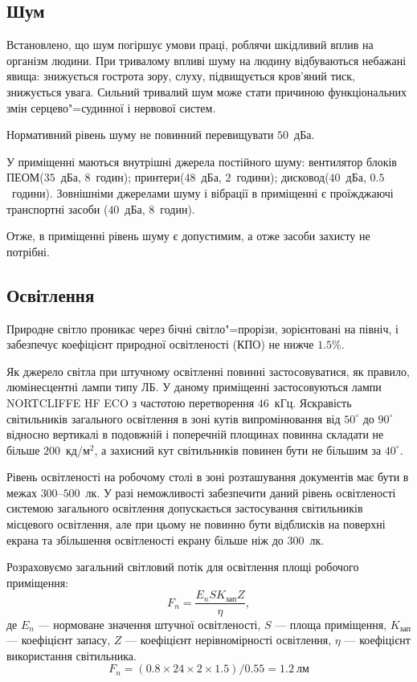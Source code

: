 \documentclass{diploma}
\begin{document}
    \subsection{Шум}
      Встановлено, що шум погіршує умови праці, роблячи шкідливий вплив на
      організм людини.
      При тривалому впливі шуму на людину відбуваються небажані явища:
      знижується гострота зору, слуху, підвищується кров’яний тиск, знижується
      увага.
      Сильний тривалий шум може стати причиною функціональних змін
      серцево"=судинної і нервової систем.

      Нормативний рівень шуму не повинний перевищувати $50$~дБа\cite{dsn037}.

      У приміщенні маються внутрішні джерела постійного шуму: вентилятор
      блоків ПЕОМ($35$~дБа, $8$~годин); принтери($48$~дБа, $2$~години);
      дисковод($40$~дБа, $0.5$~години).
      Зовнішніми джерелами шуму і вібрації в приміщенні є проїжджаючі
      транспортні засоби ($40$~дБа, $8$~годин).

      Отже, в приміщенні рівень шуму є допустимим, а отже засоби захисту не
      потрібні.
    \subsection{Освітлення}
      Природне світло проникає через бічні світло"=прорізи, зорієнтовані на
      північ, і забезпечує коефіцієнт природної освітленості (КПО) не нижче
      $1.5\%$.

      Як джерело світла при штучному освітленні повинні застосовуватися, як
      правило, люмінесцентні лампи типу ЛБ.
      У даному приміщенні застосовуються лампи NORTCLIFFE HF ECO з частотою
      перетворення $46$~кГц.
      Яскравість світильників загального освітлення в зоні кутів
      випромінювання від $50^\circ$ до $90^\circ$ відносно вертикалі в
      подовжній і поперечній площинах повинна складати не більше
      $200$~кд/м$^2$, а захисний кут світильників повинен бути не більшим за
      $40^\circ$.~\cite{dbn28}

      Рівень освітленості на робочому столі в зоні розташування документів має
      бути в межах $300$--$500$~лк.
      У разі неможливості забезпечити даний рівень освітленості системою
      загального освітлення допускається застосування світильників місцевого
      освітлення, але при цьому не повинно бути відблисків на поверхні екрана
      та збільшення освітленості екрану більше ніж до $300$~лк.

      Розраховуємо загальний світловий потік для освітлення площі робочого
      приміщення:
      \begin{equation}
        F_{n} = \frac{E_n S K_\text{зап} Z}{\eta},
        \label{eq:f-n}
      \end{equation}
      де $E_n$ --- нормоване значення штучної освітленості, $S$ --- площа
      приміщення, $K_\text{зап}$ --- коефіцієнт запасу, $Z$ --- коефіцієнт
      нерівномірності освітлення, $\eta$ --- коефіцієнт використання
      світильника.
      \[ F_{n} = (0.8 \times 24 \times 2 \times 1.5) / 0.55 = 1.2~\text{лм} \]
\end{document}
